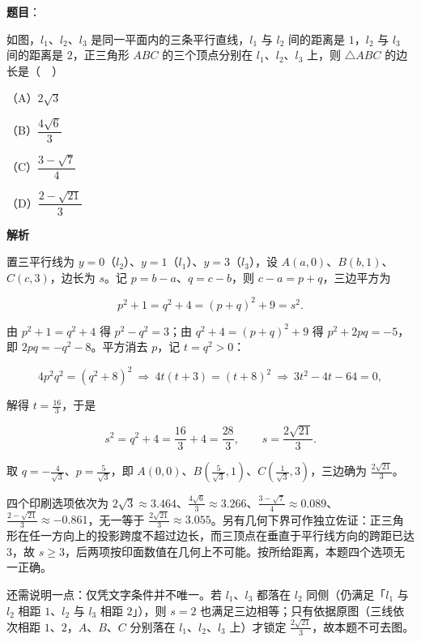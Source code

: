 \begin{answer}

\textbf{题目}：

如图，$l_1$、$l_2$、$l_3$ 是同一平面内的三条平行直线，$l_1$ 与 $l_2$ 间的距离是 $1$，$l_2$ 与 $l_3$ 间的距离是 $2$，正三角形 $ABC$ 的三个顶点分别在 $l_1$、$l_2$、$l_3$ 上，则 $\triangle ABC$ 的边长是（　）
\nopagebreak[4]
\begin{center}\end{center}
\nopagebreak[4]
（A）$2\sqrt3$

（B）$\dfrac{4\sqrt6}{3}$

（C）$\dfrac{3-\sqrt7}{4}$

（D）$\dfrac{2-\sqrt{21}}{3}$

\textbf{解析}

置三平行线为 $y=0$（$l_2$）、$y=1$（$l_1$）、$y=3$（$l_3$），设 $A(a,0)$、$B(b,1)$、$C(c,3)$，边长为 $s$。记 $p=b-a$、$q=c-b$，则 $c-a=p+q$，三边平方为

\nopagebreak[4]
\[p^{2}+1=q^{2}+4=(p+q)^{2}+9=s^{2}.\]

由 $p^{2}+1=q^{2}+4$ 得 $p^{2}-q^{2}=3$；由 $q^{2}+4=(p+q)^{2}+9$ 得 $p^{2}+2pq=-5$，即 $2pq=-q^{2}-8$。平方消去 $p$，记 $t=q^{2}>0$：

\nopagebreak[4]
\[4p^{2}q^{2}=(q^{2}+8)^{2}\ \Longrightarrow\ 4t(t+3)=(t+8)^{2}\ \Longrightarrow\ 3t^{2}-4t-64=0,\]

解得 $t=\frac{16}{3}$，于是

\nopagebreak[4]
\[s^{2}=q^{2}+4=\frac{16}{3}+4=\frac{28}{3},\qquad s=\frac{2\sqrt{21}}{3}.\]

取 $q=-\frac{4}{\sqrt3}$、$p=\frac{5}{\sqrt3}$，即 $A(0,0)$、$B\left(\frac{5}{\sqrt3},1\right)$、$C\left(\frac{1}{\sqrt3},3\right)$，三边确为 $\frac{2\sqrt{21}}{3}$。

四个印刷选项依次为 $2\sqrt3\approx3.464$、$\frac{4\sqrt6}{3}\approx3.266$、$\frac{3-\sqrt7}{4}\approx0.089$、$\frac{2-\sqrt{21}}{3}\approx-0.861$，无一等于 $\frac{2\sqrt{21}}{3}\approx3.055$。另有几何下界可作独立佐证：正三角形在任一方向上的投影跨度不超过边长，而三顶点在垂直于平行线方向的跨距已达 $3$，故 $s\geqslant3$，后两项按印面数值在几何上不可能。按所给距离，本题四个选项无一正确。

还需说明一点：仅凭文字条件并不唯一。若 $l_1$、$l_3$ 都落在 $l_2$ 同侧（仍满足「$l_1$ 与 $l_2$ 相距 $1$、$l_2$ 与 $l_3$ 相距 $2$」），则 $s=2$ 也满足三边相等；只有依据原图（三线依次相距 $1$、$2$，$A$、$B$、$C$ 分别落在 $l_1$、$l_2$、$l_3$ 上）才锁定 $\frac{2\sqrt{21}}{3}$，故本题不可去图。


\end{answer}
